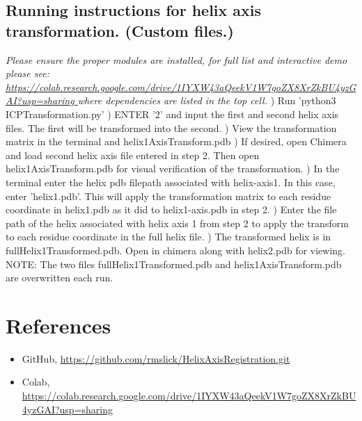 \documentclass[12pt]{article}
\begin{document}
\subsection*{Running instructions for helix axis transformation. (Custom files.)}
\emph{\newline Please ensure the proper modules are installed, for full list and interactive demo please see: \url{https://colab.research.google.com/drive/1IYXW43aQeekV1W7goZX8XrZkBU4yzGAI?usp=sharing } where dependencies are listed in the top cell.}
\newline{}) Run 'python3 ICPTransformation.py'
) ENTER '2' and input the first and second helix axis files.  The first will be transformed into the second.
) View the transformation matrix in the terminal and helix1AxisTransform.pdb
) If desired, open Chimera and load second helix axis file entered in step 2.  Then open helix1AxisTransform.pdb for visual verification of the transformation.
) In the terminal enter the helix pdb filepath associated with helix-axis1.  In this case, enter 'helix1.pdb'. This will apply the transformation matrix to each residue coordinate in helix1.pdb as it did to helix1-axis.pdb in step 2.
) Enter the file path of the helix associated with helix axis 1 from step 2 to apply the transform to each residue coordinate in the full helix file.
) The transformed helix is in fullHelix1Transformed.pdb.  Open in chimera along with helix2.pdb for viewing. \newline\newline NOTE: The two files fullHelix1Transformed.pdb and helix1AxisTransform.pdb are overwritten each run.

\section*{References}

\begin{itemize}
    \item {GitHub, \url{https://github.com/rmslick/HelixAxisRegistration.git}}
    \item {Colab, \url{https://colab.research.google.com/drive/1IYXW43aQeekV1W7goZX8XrZkBU4yzGAI?usp=sharing}}
\end{itemize}
\end{document}
